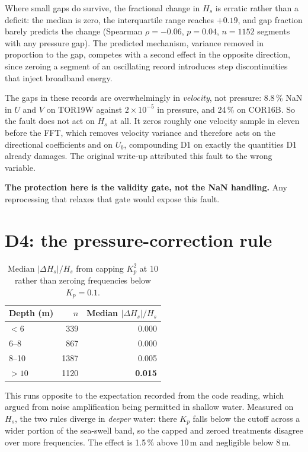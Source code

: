 \documentclass[11pt]{article}
\begin{document}
Where small gaps do survive, the fractional change in $H_s$ is erratic rather
than a deficit: the median is zero, the interquartile range reaches $+0.19$, and
gap fraction barely predicts the change (Spearman $\rho = -0.06$, $p = 0.04$,
$n = 1152$ segments with any pressure gap). The predicted mechanism, variance
removed in proportion to the gap, competes
with a second effect in the opposite direction, since zeroing a segment of an
oscillating record introduces step discontinuities that inject broadband energy.

The gaps in these records are overwhelmingly in \emph{velocity}, not pressure:
8.8\,\% NaN in $U$ and $V$ on TOR19W against $2\times10^{-5}$ in pressure, and
24\,\% on COR16B. So the fault does not act on $H_s$ at all. It zeros roughly one
velocity sample in eleven before the FFT, which removes velocity variance and
therefore acts on the directional coefficients and on $U_b$, compounding D1 on
exactly the quantities D1 already damages. The original write-up attributed this
fault to the wrong variable.

\textbf{The protection here is the validity gate, not the NaN handling.} Any
reprocessing that relaxes that gate would expose this fault.

\section{D4: the pressure-correction rule}

\begin{table}[htbp]
  \centering
  \caption{Median $|\Delta H_s|/H_s$ from capping $K_p^2$ at 10 rather than
  zeroing frequencies below $K_p = 0.1$.}
  \begin{tabular}{@{}lrr@{}}
    \toprule
    Depth (m) & $n$ & Median $|\Delta H_s|/H_s$ \\
    \midrule
    $<6$    &  339 & 0.000 \\
    6--8    &  867 & 0.000 \\
    8--10   & 1387 & 0.005 \\
    $>10$   & 1120 & \textbf{0.015} \\
    \bottomrule
  \end{tabular}
\end{table}

This runs opposite to the expectation recorded from the code reading, which
argued from noise amplification being permitted in shallow water. Measured on
$H_s$, the two rules diverge in \emph{deeper} water: there $K_p$ falls below the
cutoff across a wider portion of the sea-swell band, so the capped and zeroed
treatments disagree over more frequencies. The effect is 1.5\,\% above 10\,m and
negligible below 8\,m.
\end{document}
